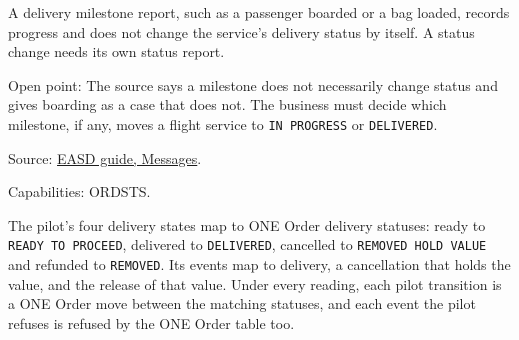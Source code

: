 \begin{theorem}
  \label{thm:delivery-milestones-not-status}
  \notready
  A delivery milestone report, such as a passenger boarded or a bag loaded,
  records progress and does not change the service's delivery status by
  itself. A status change needs its own status report.

  Open point: The source says a milestone does not necessarily change status
  and gives boarding as a case that does not. The business must decide which
  milestone, if any, moves a flight service to \texttt{IN PROGRESS} or
  \texttt{DELIVERED}.

  Source: \href{https://standards.atlassian.net/wiki/spaces/EASD/pages/574652427/Messages}{EASD guide, Messages}.

  Capabilities: ORDSTS.
\end{theorem}

\begin{definition}
  \label{def:delivery-pilot}
  The pilot's four delivery states map to ONE Order delivery statuses:
  ready to \texttt{READY TO PROCEED}, delivered to \texttt{DELIVERED},
  cancelled to \texttt{REMOVED HOLD VALUE} and refunded to
  \texttt{REMOVED}.  Its events map to delivery, a cancellation that holds
  the value, and the release of that value.  Under every reading, each
  pilot transition is a ONE Order move between the matching statuses, and
  each event the pilot refuses is refused by the ONE Order table too.
\end{definition}
